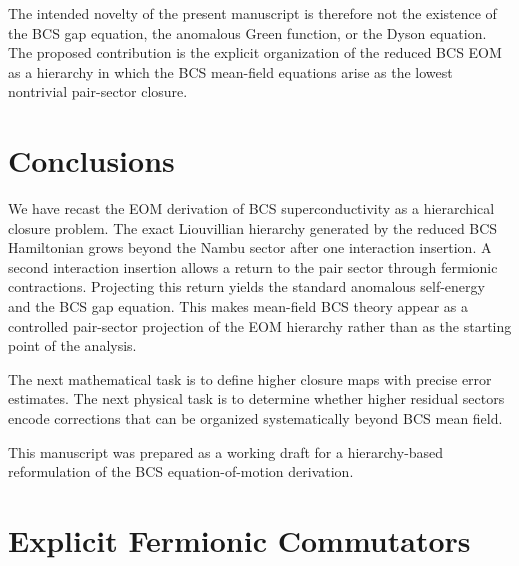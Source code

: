 \documentclass[aps,prb,reprint,superscriptaddress,nofootinbib]{revtex4-2}
\begin{document}
The intended novelty of the present manuscript is therefore not the existence of the BCS gap equation, the anomalous Green function, or the Dyson equation. The proposed contribution is the explicit organization of the reduced BCS EOM as a hierarchy in which the BCS mean-field equations arise as the lowest nontrivial pair-sector closure.

\section{Conclusions}

We have recast the EOM derivation of BCS superconductivity as a hierarchical closure problem. The exact Liouvillian hierarchy generated by the reduced BCS Hamiltonian grows beyond the Nambu sector after one interaction insertion. A second interaction insertion allows a return to the pair sector through fermionic contractions. Projecting this return yields the standard anomalous self-energy and the BCS gap equation. This makes mean-field BCS theory appear as a controlled pair-sector projection of the EOM hierarchy rather than as the starting point of the analysis.

The next mathematical task is to define higher closure maps with precise error estimates. The next physical task is to determine whether higher residual sectors encode corrections that can be organized systematically beyond BCS mean field.

\begin{acknowledgments}
This manuscript was prepared as a working draft for a hierarchy-based reformulation of the BCS equation-of-motion derivation.
\end{acknowledgments}

\appendix

\section{Explicit Fermionic Commutators}
\end{document}
